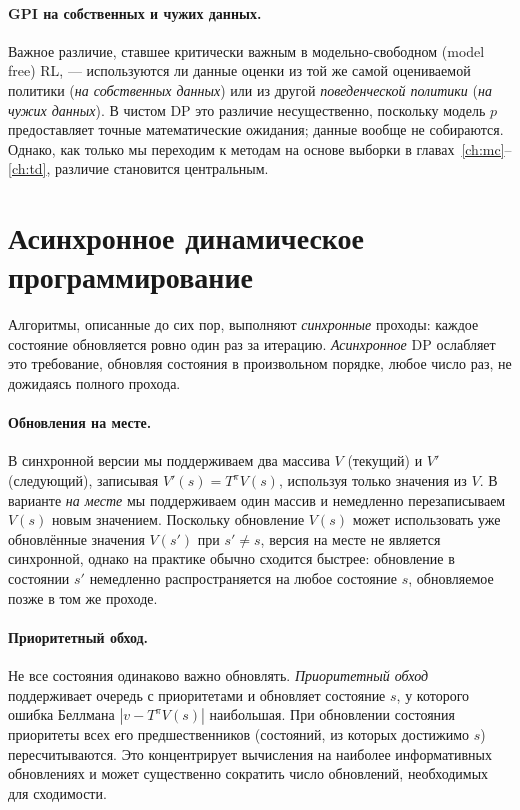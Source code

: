 \paragraph{GPI на собственных и чужих данных.}
Важное различие, ставшее критически важным в модельно-свободном (model free) RL, — используются ли данные оценки из той же самой оцениваемой политики (\emph{на собственных данных}) или из другой \emph{поведенческой политики} (\emph{на чужих данных}).  В чистом DP это различие несущественно, поскольку модель $p$ предоставляет точные математические ожидания; данные вообще не собираются.  Однако, как только мы переходим к методам на основе выборки в главах~\ref{ch:mc}--\ref{ch:td}, различие становится центральным.

\section{Асинхронное динамическое программирование}
\label{sec:async-dp}

Алгоритмы, описанные до сих пор, выполняют \emph{синхронные} проходы: каждое состояние обновляется ровно один раз за итерацию.  \emph{Асинхронное} DP ослабляет это требование, обновляя состояния в произвольном порядке, любое число раз, не дожидаясь полного прохода.

\paragraph{Обновления на месте.}
В синхронной версии мы поддерживаем два массива $V$ (текущий) и $V'$ (следующий), записывая $V'(s) = T^\pi V(s)$, используя только значения из $V$.  В варианте \emph{на месте} мы поддерживаем один массив и немедленно перезаписываем $V(s)$ новым значением.  Поскольку обновление $V(s)$ может использовать уже обновлённые значения $V(s')$ при $s' \ne s$, версия на месте не является синхронной, однако на практике обычно сходится быстрее: обновление в состоянии $s'$ немедленно распространяется на любое состояние $s$, обновляемое позже в том же проходе.

\paragraph{Приоритетный обход.}
Не все состояния одинаково важно обновлять.  \emph{Приоритетный обход} поддерживает очередь с приоритетами и обновляет состояние $s$, у которого ошибка Беллмана $|v - T^\pi V(s)|$ наибольшая.  При обновлении состояния приоритеты всех его предшественников (состояний, из которых достижимо $s$) пересчитываются.  Это концентрирует вычисления на наиболее информативных обновлениях и может существенно сократить число обновлений, необходимых для сходимости.

